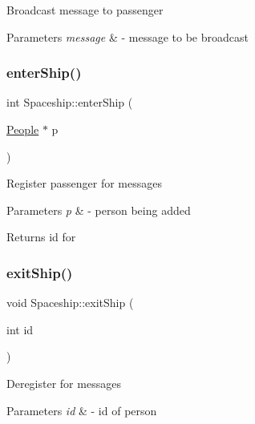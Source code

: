Broadcast message to passenger 
\begin{DoxyParams}{Parameters}
{\em message} & -\/ message to be broadcast \\
\hline
\end{DoxyParams}
\mbox{\label{classSpaceship_a3ed78b14953957576e42c6e741e04690}} 
\subsubsection{\texorpdfstring{enter\+Ship()}{enterShip()}}
{\footnotesize\ttfamily int Spaceship\+::enter\+Ship (\begin{DoxyParamCaption}\item[{\hyperlink{classPeople}{People} $\ast$}]{p }\end{DoxyParamCaption})\hspace{0.3cm}{\ttfamily [virtual]}}

Register passenger for messages 
\begin{DoxyParams}{Parameters}
{\em p} & -\/ person being added \\
\hline
\end{DoxyParams}
\begin{DoxyReturn}{Returns}
id for 
\end{DoxyReturn}
\mbox{\label{classSpaceship_ae3ddb55d813fa2a3454c1745b23cf6ef}} 
\subsubsection{\texorpdfstring{exit\+Ship()}{exitShip()}}
{\footnotesize\ttfamily void Spaceship\+::exit\+Ship (\begin{DoxyParamCaption}\item[{int}]{id }\end{DoxyParamCaption})\hspace{0.3cm}{\ttfamily [virtual]}}

Deregister for messages 
\begin{DoxyParams}{Parameters}
{\em id} & -\/ id of person \\
\hline
\end{DoxyParams}
\mbox{\label{classSpaceship_a949e9815b99d5598da2239e307036141}} 
